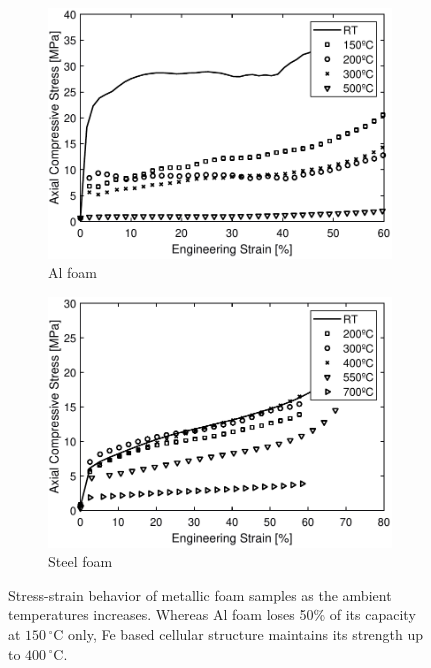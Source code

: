 \documentclass[review]{elsarticle}
\begin{document}
{\begin{figure}
	\centering
	\begin{subfigure}{.5\textwidth}
		\centering
		\includegraphics[width=0.98\linewidth]{Tex-Figures/Fig08a.pdf}
		\caption{Al foam}
		\label{fig8:sub1}
	\end{subfigure}%
	\begin{subfigure}{.5\textwidth}
		\centering
		\includegraphics[width=0.98\linewidth]{Tex-Figures/Fig08b.pdf}
		\caption{Steel foam}
		\label{fig8:sub2}
	\end{subfigure}
	\caption{Stress-strain behavior of metallic foam samples as the ambient temperatures increases. Whereas Al foam loses 50\% of its capacity at $150\,^{\circ}\mathrm{C}$ only, Fe based cellular structure maintains its strength up to  $400\,^{\circ}\mathrm{C}$.}
	\label{fig:FoamStrStr}
\end{figure}

}
\end{document}
